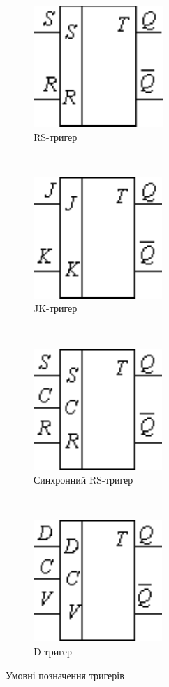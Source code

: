 \documentclass[a4paper,oneside,DIV=10,12pt]{scrartcl}
\begin{document}
			\begin{figure}[!htbp]
			\centering
				\begin{subfigure}[t]{0.2\textwidth}
				\centering
					\includegraphics[]{flipflop-rs.pdf}
				\caption{RS-тригер}
				\end{subfigure}
				~
				\begin{subfigure}[t]{0.2\textwidth}
				\centering
					\includegraphics[]{flipflop-jk.pdf}
				\caption{JK-тригер}
				\end{subfigure}
				~
				\begin{subfigure}[t]{0.2\textwidth}
				\centering
					\includegraphics[]{flipflop-rs-sync.pdf}
				\caption{Синхронний RS-тригер}
				\end{subfigure}
				~
				\begin{subfigure}[t]{0.2\textwidth}
				\centering
					\includegraphics[]{flipflop-d.pdf}
				\caption{D-тригер}
				\end{subfigure}
			\caption{Умовні позначення тригерів}
			\label{fig:flipflop-notation}
			\end{figure}
			
\end{document}
